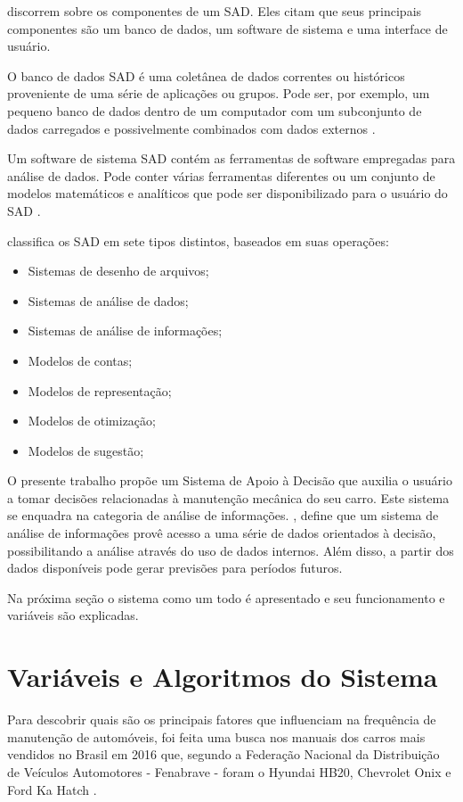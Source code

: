 \documentclass[12pt]{article}
\begin{document}
 discorrem sobre os componentes de um SAD. Eles
citam que seus principais componentes são um banco de dados, um software de
sistema e uma interface de usuário.

O banco de dados SAD é uma coletânea de dados correntes ou históricos
proveniente de uma série de aplicações ou grupos. Pode ser, por exemplo, um
pequeno banco de dados dentro de um computador com um subconjunto de dados
carregados e possivelmente combinados com dados externos
\cite{kenneth2011sistemas}.

Um software de sistema SAD contém as ferramentas de software empregadas para
análise de dados. Pode conter várias ferramentas diferentes ou um conjunto de
modelos matemáticos e analíticos que pode ser disponibilizado para o usuário do
SAD \cite{kenneth2011sistemas}.

 classifica os SAD em sete tipos distintos,
baseados em suas operações:

\begin{itemize}
  \item Sistemas de desenho de arquivos;
  \item Sistemas de análise de dados;
  \item Sistemas de análise de informações;
  \item Modelos de contas;
  \item Modelos de representação;
  \item Modelos de otimização;
  \item Modelos de sugestão;
\end{itemize}

O presente trabalho propõe um Sistema de Apoio à Decisão que auxilia o usuário
a tomar decisões relacionadas à manutenção mecânica do seu carro. Este sistema
se enquadra na categoria de análise de informações.
, define que um sistema de análise de informações
provê acesso a uma série de dados orientados à decisão, possibilitando a análise
através do uso de dados internos. Além disso, a partir dos dados disponíveis
pode gerar previsões para períodos futuros.

Na próxima seção o sistema como um todo é apresentado e seu funcionamento e
variáveis são explicadas.

\section{Variáveis e Algoritmos do Sistema} \label{sec:algoritmos}
Para descobrir quais são os principais fatores que influenciam na frequência de
manutenção de automóveis, foi feita uma busca nos manuais dos carros mais vendidos
no Brasil em 2016 que, segundo a Federação Nacional da Distribuição de Veículos
Automotores - Fenabrave - foram o Hyundai HB20, Chevrolet Onix e Ford Ka Hatch
\cite{fenabrave}.
\end{document}
